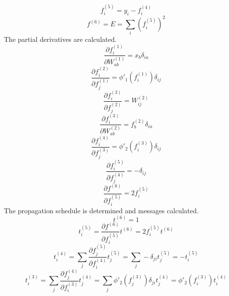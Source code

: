 \documentclass[fleqn]{report}
\begin{document}
\begin{equation}
    f^{(5)}_i = y_i - f^{(4)}_i
\end{equation}
\begin{equation}
    f^{(6)} = E = \sum_i \left ( f^{(5)}_i \right )^2
\end{equation}
The partial derivatives are calculated.
\begin{equation}
    \frac{\partial f^{(1)}_i}{\partial W^{(1)}_{ab}} = x_b \delta_{ia}
\end{equation}
\begin{equation}
    \frac{\partial f^{(2)}_i}{\partial f^{(1)}_j} = \phi'_1 \left ( f^{(1)}_i \right ) \delta_{ij}
\end{equation}
\begin{equation}
    \frac{\partial f^{(3)}_i}{\partial f^{(2)}_j} = W^{(2)}_{ij}
\end{equation}
\begin{equation}
    \frac{\partial f^{(3)}_i}{\partial W^{(2)}_{ab}} = f^{(2)}_b \delta_{ia}
\end{equation}
\begin{equation}
    \frac{\partial f^{(4)}_i}{\partial f^{(3)}_j} = \phi'_2 \left ( f^{(3)}_i \right ) \delta_{ij}
\end{equation}
\begin{equation}
    \frac{\partial f^{(5)}_i}{\partial f^{(4)}_j} = - \delta_{ij}
\end{equation}
\begin{equation}
    \frac{\partial f^{(6)}}{\partial f^{(5)}_i} = 2 f^{(5)}_i
\end{equation}
The propagation schedule is determined and messages calculated.
\begin{equation}
    t^{(6)} = 1
\end{equation}
\begin{equation}
    t^{(5)}_i = \frac{\partial f^{(6)}}{\partial f^{(5)}_i} t^{(6)} = 2 f^{(5)}_i t^{(6)}
\end{equation}
\begin{equation}
    t^{(4)}_i = \sum_j \frac{\partial f^{(5)}_j}{\partial f^{(4)}_i} t^{(5)}_j = \sum_j - \delta_{ji} t^{(5)}_j = - t^{(5)}_i
\end{equation}
\begin{equation}
    t^{(3)}_i = \sum_j \frac{\partial f^{(4)}_j}{\partial f^{(3)}_i} t^{(4)}_j = \sum_j \phi'_2 \left ( f^{(3)}_j \right ) \delta_{ji} t^{(4)}_j = \phi'_2 \left ( f^{(3)}_i \right ) t^{(4)}_i
\end{equation}
\end{document}

